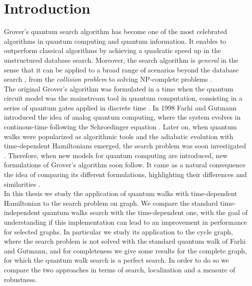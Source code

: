 \newpage
\vspace{-1cm}
\chapter*{\textbf{Introduction}}

\vspace{-2cm}
Grover's quantum search algorithm has become one of the most celebrated algorithms in quantum computing and quantum information. It enables to outperform classical algorithms by achieving a quadratic speed up in the unstructured database search. Moreover, the search algorithm is \textit{general} in the sense that it can be applied to a broad range of scenarios beyond the database search \cite{Nielsen2000}, from the \textit{collision problem} \cite{Brassard2015} to solving  NP-complete problems \cite{10.1007/978-3-540-78773-0_67}.\\


The original Grover's algorithm was formulated in a time when the quantum circuit model was the mainstream tool in quantum computation, consisting in a series of quantum gates applied in discrete time \cite{Wong2016}. In 1998 Farhi and Gutmann introduced the idea of analog quantum computing, where the system evolves in continous-time following the Schroedinger equation \cite{Farhi1998}. Later on, when quantum walks were popularized as algorithmic tools and the adiabatic evolution with time-dependent Hamiltonians emerged, the search problem was soon investigated \cite{Childs2004, Farhi2000}. Therefore, when new models for quantum computing are introduced, new formulations of Grover's algorithm soon follow. It came as a natural consequence the idea of comparing its different formulations, highlighting their differences and similarities \cite{Wong2016}. \\


In this thesis we study the application of quantum walks with time-dependent Hamiltonian to the search problem on graph. We compare the standard time-independent quantum walks search with the time-dependent one, with the goal of understanding if this implementation can lead to an improvement in performance for selected graphs. In particular we study its application to the cycle graph, where the search problem is not solved with the standard quantum walk of Farhi and Gutmann, and for completeness we give some results for the complete graph, for which the quantum walk search is a perfect search. In order to do so we compare the two approaches in terms of search, localization and a measure of robustness.\\ \\

